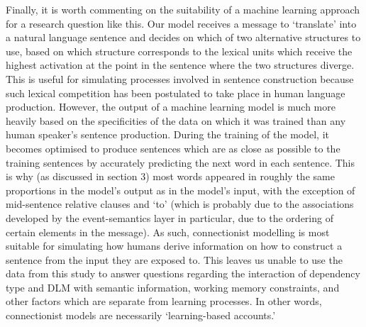 \documentclass{article}
\begin{document}
Finally, it is worth commenting on the suitability of a machine learning approach for a research question like this. Our model receives a message to `translate' into a natural language sentence and decides on which of two alternative structures to use, based on which structure corresponds to the lexical units which receive the highest activation at the point in the sentence where the two structures diverge. This is useful for simulating processes involved in sentence construction because such lexical competition has been postulated to take place in human language production. However, the output of a machine learning model is much more heavily based on the specificities of the data on which it was trained than any human speaker's sentence production. During the training of the model, it becomes optimised to produce sentences which are as close as possible to the training sentences by accurately predicting the next word in each sentence. This is why (as discussed in section 3) most words appeared in roughly the same proportions in the model's output as in the model's input, with the exception of mid-sentence relative clauses and `to' (which is probably due to the associations developed by the event-semantics layer in particular, due to the ordering of certain elements in the message). As such, connectionist modelling is most suitable for simulating how humans derive information on how to construct a sentence from the input they are exposed to. This leaves us unable to use the data from this study to answer questions regarding the interaction of dependency type and DLM with semantic information, working memory constraints, and other factors which are separate from learning processes. In other words, connectionist models are necessarily `learning-based accounts.'
\end{document}
